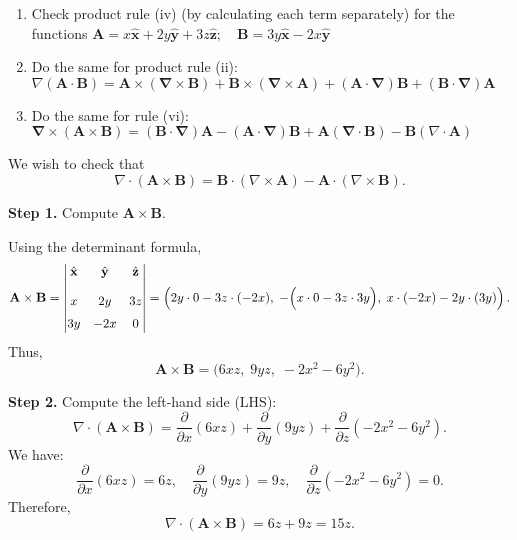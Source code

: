 \begin{hwkProblem}{1.25}{}
	\begin{enumerate}
		\item Check product rule (iv) (by calculating each term separately) for the functions \( \mathbf{A}=x \hat{\mathbf{x}}+2 y \hat{\mathbf{y}}+3 z \hat{\mathbf{z}} ; \quad \mathbf{B}=3 y \hat{\mathbf{x}}-2 x \hat{\mathbf{y}} \)
		\item Do the same for product rule (ii): \(\nabla(\mathbf{A} \cdot \mathbf{B})=\mathbf{A} \times(\boldsymbol{\nabla} \times \mathbf{B})+\mathbf{B} \times(\boldsymbol{\nabla} \times \mathbf{A})+(\mathbf{A} \cdot \boldsymbol{\nabla}) \mathbf{B}+(\mathbf{B} \cdot \boldsymbol{\nabla}) \mathbf{A}\)
		\item Do the same for rule (vi): \(\boldsymbol{\nabla} \times(\mathbf{A} \times \mathbf{B})=(\mathbf{B} \cdot \boldsymbol{\nabla}) \mathbf{A}-(\mathbf{A} \cdot \boldsymbol{\nabla}) \mathbf{B}+\mathbf{A}(\boldsymbol{\nabla} \cdot \mathbf{B})-\mathbf{B}(\nabla \cdot \mathbf{A})\)
	\end{enumerate}

	\hwkSol


	We wish to check that
	\[
		\nabla\cdot(\mathbf{A}\times\mathbf{B}) = \mathbf{B}\cdot(\nabla\times\mathbf{A}) - \mathbf{A}\cdot(\nabla\times\mathbf{B}).
	\]

	\textbf{Step 1.} Compute \(\mathbf{A}\times\mathbf{B}\).

	Using the determinant formula,
	\[
		\mathbf{A}\times\mathbf{B} = 
		\begin{vmatrix}
			\hat{\mathbf{x}} & \hat{\mathbf{y}} & \hat{\mathbf{z}} \\[4mm]
			x & 2y & 3z \\[2mm]
			3y & -2x & 0
		\end{vmatrix}
		=
		\left( 2y\cdot0 - 3z\cdot(-2x),\; -\Bigl(x\cdot0 - 3z\cdot3y\Bigr),\; x\cdot(-2x) - 2y\cdot(3y) \right).
	\]
	Thus,
	\[
		\mathbf{A}\times\mathbf{B} = \bigl(6xz,\; 9yz,\; -2x^2 - 6y^2\bigr).
	\]

	\textbf{Step 2.} Compute the left-hand side (LHS):
	\[
		\nabla\cdot(\mathbf{A}\times\mathbf{B}) = \frac{\partial}{\partial x}(6xz) + \frac{\partial}{\partial y}(9yz) + \frac{\partial}{\partial z}(-2x^2-6y^2).
	\]
	We have:
	\[
		\frac{\partial}{\partial x}(6xz)=6z,\quad \frac{\partial}{\partial y}(9yz)=9z,\quad \frac{\partial}{\partial z}(-2x^2-6y^2)=0.
	\]
	Therefore,
	\[
		\nabla\cdot(\mathbf{A}\times\mathbf{B}) = 6z + 9z = 15z.
	\]


\end{hwkProblem}
